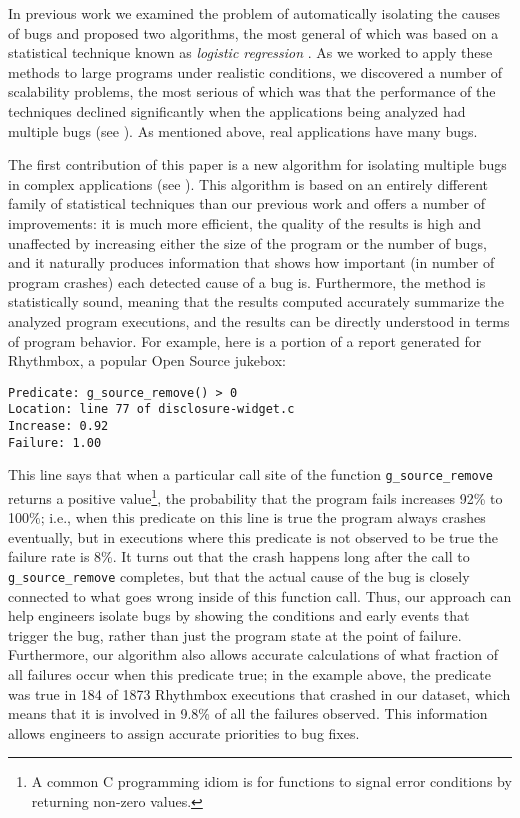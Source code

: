\documentclass{sig-alternate}
\begin{document}
In previous work we examined the problem of automatically isolating
the causes of bugs and proposed two algorithms, the most general of
which was based on a statistical technique known as {\em logistic
regression} \cite{PLDI`03*141,Zheng:2003:SDSP}.  As we worked to apply
these methods to large programs under realistic conditions, we
discovered a number of scalability problems, the most serious of which
was that the performance of the techniques declined significantly 
when the applications being analyzed had multiple bugs (see
).  As mentioned above, real applications
have many bugs.

The first contribution of this paper is a new algorithm for isolating
multiple bugs in complex applications (see ).  This algorithm 
is based on an entirely different family of statistical techniques than our previous work and offers
a number of improvements:
it is much more efficient, the quality of the
results is high and unaffected by increasing either the size of the program
or the number of bugs, and it naturally produces information
that shows how important (in number of program crashes) each detected
cause of a bug is.  Furthermore, the method is statistically sound, meaning that
the results computed accurately summarize the analyzed program 
executions, and the results can be directly understood in terms of program behavior.
For example, here is a portion of a report generated for Rhythmbox,
a popular Open Source jukebox:
\begin{verbatim}
Predicate: g_source_remove() > 0 
Location: line 77 of disclosure-widget.c
Increase: 0.92   
Failure: 1.00   
\end{verbatim}
This line says that when a particular call site of the function {\tt g\_source\_remove} returns a 
positive value\footnote{A common C programming idiom is for functions to signal error conditions by returning non-zero values.}, the probability that the program fails 
increases 92\% to 100\%; i.e., when this predicate on this line is true the program always crashes eventually, but in executions where this predicate is not
observed to be true the failure rate is 8\%.  It turns out that the crash happens long after the call to {\tt g\_source\_remove} completes,
but that the actual cause of the bug is closely connected to what goes wrong inside of this function call.  Thus,
our approach can help engineers isolate bugs by showing the conditions and early events that trigger the bug, rather than just the
program state at the point of failure.  Furthermore, our algorithm also allows accurate calculations of what fraction of all failures occur when this predicate
true; in the example above, the predicate was true in 184 of 1873 Rhythmbox executions that crashed in our dataset, which means that
it is involved in 9.8\% of all the failures observed.  This information allows engineers to assign accurate priorities to bug fixes.
\end{document}
